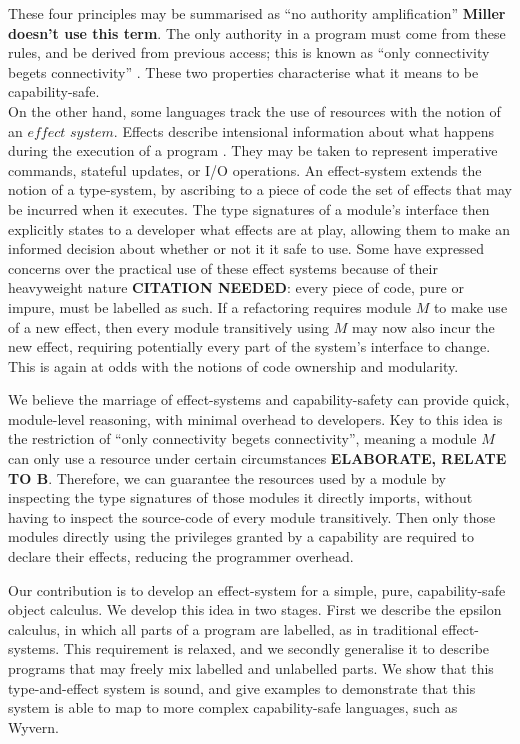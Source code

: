\documentclass[a4paper,UKenglish]{lipics-v2016}
\begin{document}
These four principles may be summarised as ``no authority amplification'' \textbf{Miller doesn't use this term}. The only authority in a program must come from these rules, and be derived from previous access; this is known as ``only connectivity begets connectivity'' \cite{miller06}. These two properties characterise what it means to be capability-safe. \\

\noindent
On the other hand, some languages track the use of resources with the notion of an $\textit{effect system}$. Effects describe intensional information about what happens during the execution of a program \cite{nielson99}. They may be taken to represent imperative commands, stateful updates, or I/O operations. An effect-system extends the notion of a type-system, by ascribing to a piece of code the set of effects that may be incurred when it executes. The type signatures of a module's interface then explicitly states to a developer what effects are at play, allowing them to make an informed decision about whether or not it it safe to use. Some have expressed concerns over the practical use of these effect systems because of their heavyweight nature \textbf{CITATION NEEDED}: every piece of code, pure or impure, must be labelled as such. If a refactoring requires module $M$ to make use of a new effect, then every module transitively using $M$ may now also incur the new effect, requiring potentially every part of the system's interface to change. This is again at odds with the notions of code ownership and modularity.

We believe the marriage of effect-systems and capability-safety can provide quick, module-level reasoning, with minimal overhead to developers. Key to this idea is the restriction of ``only connectivity begets connectivity'', meaning a module $M$ can only use a resource under certain circumstances \textbf{ELABORATE, RELATE TO B}. Therefore, we can guarantee the resources used by a module by inspecting the type signatures of those modules it directly imports, without having to inspect the source-code of every module transitively. Then only those modules directly using the privileges granted by a capability are required to declare their effects, reducing the programmer overhead.

Our contribution is to develop an effect-system for a simple, pure, capability-safe object calculus. We develop this idea in two stages. First we describe the epsilon calculus, in which all parts of a program are labelled, as in traditional effect-systems. This requirement is relaxed, and we secondly generalise it to describe programs that may freely mix labelled and unlabelled parts. We show that this type-and-effect system is sound, and give examples to demonstrate that this system is able to map to more complex capability-safe languages, such as Wyvern.
\end{document}
